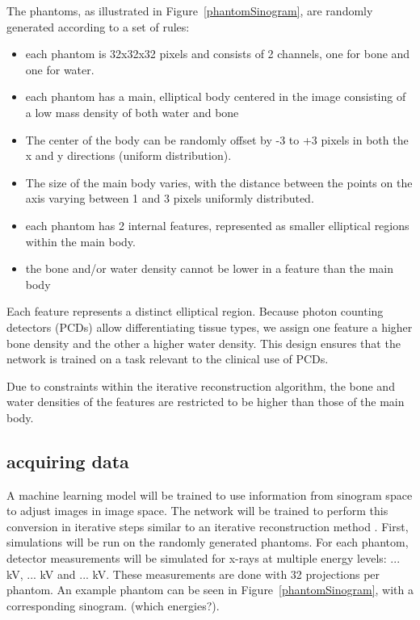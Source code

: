 \documentclass{article}
\begin{document}
The phantoms, as illustrated in Figure~\ref{phantomSinogram}, are randomly generated according to a set of rules:

\begin{itemize}
\item each phantom is 32x32x32 pixels and consists of 2 channels, one for bone and one for water.
\item each phantom has a main, elliptical body centered in the image consisting of a low mass density of both water and bone
\item The center of the body can be randomly offset by -3 to +3 pixels in both the x and y directions (uniform distribution).
\item The size of the main body varies, with the distance between the points on the axis varying between 1 and 3 pixels uniformly distributed.
\item each phantom has 2 internal features, represented as smaller elliptical regions within the main body.
\item the bone and/or water density cannot be lower in a feature than the main body
\end{itemize}

Each feature represents a distinct elliptical region. Because photon counting detectors (PCDs) allow differentiating tissue types, we assign one feature a higher bone density and the other a higher water density. This design ensures that the network is trained on a task relevant to the clinical use of PCDs.

Due to constraints within the iterative reconstruction algorithm, the bone and water densities of the features are restricted to be higher than those of the main body.

\subsection{acquiring data}

A machine learning model will be trained to use information from sinogram space to adjust images in image space. The network will be trained to perform this conversion in iterative steps similar to an iterative reconstruction method \citep{mechlem2018joint}.
First, simulations will be run on the randomly generated phantoms. For each phantom, detector measurements will be simulated for x-rays at multiple energy levels: ... kV, ... kV and ... kV. These measurements are done with 32 projections per phantom. An example phantom can be seen in Figure~\ref{phantomSinogram}, with a corresponding sinogram. (which energies?).
\end{document}
